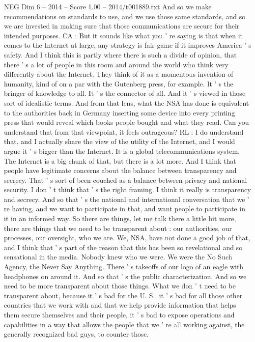 \begin{textsample}{NEG Dim 6 – 2014 – Score 1.00 – 2014/t001889.txt}
And so we make recommendations on standards to use, and we use those same standards, and so we are invested in making sure that those communications are secure for their intended purposes.
CA : But it sounds like what you ' re saying is that when it comes to the Internet at large, any strategy is fair game if it improves America ' s safety.
And I think this is partly where there is such a divide of opinion, that there ' s a lot of people in this room and around the world who think very differently about the Internet.
They think of it as a momentous invention of humanity, kind of on a par with the Gutenberg press, for example.
It ' s the bringer of knowledge to all.
It ' s the connector of all.
And it ' s viewed in those sort of idealistic terms.
And from that lens, what the NSA has done is equivalent to the authorities back in Germany inserting some device into every printing press that would reveal which books people bought and what they read.
Can you understand that from that viewpoint, it feels outrageous?
RL : I do understand that, and I actually share the view of the utility of the Internet, and I would argue it ' s bigger than the Internet.
It is a global telecommunications system.
The Internet is a big chunk of that, but there is a lot more.
And I think that people have legitimate concerns about the balance between transparency and secrecy.
That ' s sort of been couched as a balance between privacy and national security.
I don ' t think that ' s the right framing.
I think it really is transparency and secrecy.
And so that ' s the national and international conversation that we ' re having, and we want to participate in that, and want people to participate in it in an informed way.
So there are things, let me talk there a little bit more, there are things that we need to be transparent about : our authorities, our processes, our oversight, who we are.
We, NSA, have not done a good job of that, and I think that ' s part of the reason that this has been so revelational and so sensational in the media.
Nobody knew who we were.
We were the No Such Agency, the Never Say Anything.
There ' s takeoffs of our logo of an eagle with headphones on around it.
And so that ' s the public characterization.
And so we need to be more transparent about those things.
What we don ' t need to be transparent about, because it ' s bad for the U.
S., it ' s bad for all those other countries that we work with and that we help provide information that helps them secure themselves and their people, it ' s bad to expose operations and capabilities in a way that allows the people that we ' re all working against, the generally recognized bad guys, to counter those.

\end{textsample}
